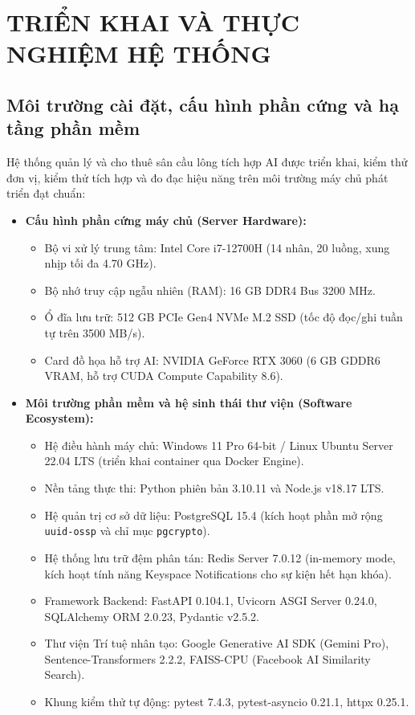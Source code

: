 
\chapter{TRIỂN KHAI VÀ THỰC NGHIỆM HỆ THỐNG}
\label{chap:trienkhai}

\section{Môi trường cài đặt, cấu hình phần cứng và hạ tầng phần mềm}
\label{sec:moitruong_thucnghiem}

Hệ thống quản lý và cho thuê sân cầu lông tích hợp AI được triển khai, kiểm thử đơn vị, kiểm thử tích hợp và đo đạc hiệu năng trên môi trường máy chủ phát triển đạt chuẩn:
\begin{itemize}[leftmargin=1.5cm]
    \item \textbf{Cấu hình phần cứng máy chủ (Server Hardware):}
    \begin{itemize}
        \item Bộ vi xử lý trung tâm: Intel Core i7-12700H (14 nhân, 20 luồng, xung nhịp tối đa 4.70 GHz).
        \item Bộ nhớ truy cập ngẫu nhiên (RAM): 16 GB DDR4 Bus 3200 MHz.
        \item Ổ đĩa lưu trữ: 512 GB PCIe Gen4 NVMe M.2 SSD (tốc độ đọc/ghi tuần tự trên 3500 MB/s).
        \item Card đồ họa hỗ trợ AI: NVIDIA GeForce RTX 3060 (6 GB GDDR6 VRAM, hỗ trợ CUDA Compute Capability 8.6).
    \end{itemize}
    \item \textbf{Môi trường phần mềm và hệ sinh thái thư viện (Software Ecosystem):}
    \begin{itemize}
        \item Hệ điều hành máy chủ: Windows 11 Pro 64-bit / Linux Ubuntu Server 22.04 LTS (triển khai container qua Docker Engine).
        \item Nền tảng thực thi: Python phiên bản 3.10.11 và Node.js v18.17 LTS.
        \item Hệ quản trị cơ sở dữ liệu: PostgreSQL 15.4 (kích hoạt phần mở rộng \texttt{uuid-ossp} và chỉ mục \texttt{pgcrypto}).
        \item Hệ thống lưu trữ đệm phân tán: Redis Server 7.0.12 (in-memory mode, kích hoạt tính năng Keyspace Notifications cho sự kiện hết hạn khóa).
        \item Framework Backend: FastAPI 0.104.1, Uvicorn ASGI Server 0.24.0, SQLAlchemy ORM 2.0.23, Pydantic v2.5.2.
        \item Thư viện Trí tuệ nhân tạo: Google Generative AI SDK (Gemini Pro), Sentence-Transformers 2.2.2, FAISS-CPU (Facebook AI Similarity Search).
        \item Khung kiểm thử tự động: pytest 7.4.3, pytest-asyncio 0.21.1, httpx 0.25.1.
    \end{itemize}
\end{itemize}

